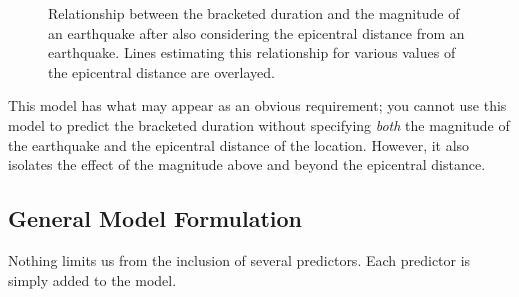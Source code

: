 \documentclass[
  letterpaper,
  DIV=11,
  numbers=noendperiod]{scrreprt}
\theoremstyle{plain}
\theoremstyle{definition}
\theoremstyle{definition}
\theoremstyle{remark}
\begin{document}
\begin{figure}


\caption{\label{fig-regextensions-mlr-plot}Relationship between the
bracketed duration and the magnitude of an earthquake after also
considering the epicentral distance from an earthquake. Lines estimating
this relationship for various values of the epicentral distance are
overlayed.}

\end{figure}%

This model has what may appear as an obvious requirement; you cannot use
this model to predict the bracketed duration without specifying
\emph{both} the magnitude of the earthquake and the epicentral distance
of the location. However, it also isolates the effect of the magnitude
above and beyond the epicentral distance.

\subsection{General Model Formulation}\label{general-model-formulation}

Nothing limits us from the inclusion of several predictors. Each
predictor is simply added to the model.
\end{document}

